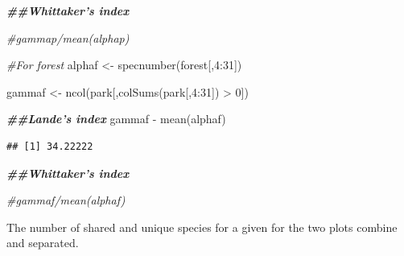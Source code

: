\documentclass[
]{article}
\newenvironment{Shaded}{\begin{snugshade}}{\end{snugshade}}
\newcommand{\AttributeTok}[1]{\textcolor[rgb]{0.77,0.63,0.00}{#1}}
\newcommand{\CommentTok}[1]{\textcolor[rgb]{0.56,0.35,0.01}{\textit{#1}}}
\newcommand{\ConstantTok}[1]{\textcolor[rgb]{0.00,0.00,0.00}{#1}}
\newcommand{\DecValTok}[1]{\textcolor[rgb]{0.00,0.00,0.81}{#1}}
\newcommand{\DocumentationTok}[1]{\textcolor[rgb]{0.56,0.35,0.01}{\textbf{\textit{#1}}}}
\newcommand{\FunctionTok}[1]{\textcolor[rgb]{0.00,0.00,0.00}{#1}}
\newcommand{\NormalTok}[1]{#1}
\newcommand{\OtherTok}[1]{\textcolor[rgb]{0.56,0.35,0.01}{#1}}
\newcommand{\SpecialCharTok}[1]{\textcolor[rgb]{0.00,0.00,0.00}{#1}}
\begin{document}
\begin{Shaded}
\begin{Highlighting}[]
\DocumentationTok{\#\#Whittaker’s index}

\CommentTok{\#gammap/mean(alphap)}

\CommentTok{\#For forest}
\NormalTok{alphaf }\OtherTok{\textless{}{-}} \FunctionTok{specnumber}\NormalTok{(forest[,}\DecValTok{4}\SpecialCharTok{:}\DecValTok{31}\NormalTok{])}

\NormalTok{gammaf }\OtherTok{\textless{}{-}} \FunctionTok{ncol}\NormalTok{(park[,}\FunctionTok{colSums}\NormalTok{(park[,}\DecValTok{4}\SpecialCharTok{:}\DecValTok{31}\NormalTok{]) }\SpecialCharTok{\textgreater{}} \DecValTok{0}\NormalTok{])}

\DocumentationTok{\#\#Lande’s index }
\NormalTok{gammaf }\SpecialCharTok{{-}} \FunctionTok{mean}\NormalTok{(alphaf)}
\end{Highlighting}
\end{Shaded}

\begin{verbatim}
## [1] 34.22222
\end{verbatim}

\begin{Shaded}
\begin{Highlighting}[]
\DocumentationTok{\#\#Whittaker’s index}

\CommentTok{\#gammaf/mean(alphaf)}
\end{Highlighting}
\end{Shaded}

The number of shared and unique species for a given for the two plots
combine and separated.

\begin{Shaded}
\end{Shaded}
\end{document}
